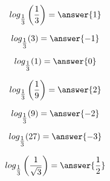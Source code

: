\documentclass{ximera}
\author{Lee Wayand}
\begin{document}
\begin{example}













\[
log_{ \tfrac{1}{3} }\left( \frac{1}{3} \right) = \answer{1}
\]





\[
log_{ \tfrac{1}{3} }(3) = \answer{-1}
\]







\[
log_{ \tfrac{1}{3} }(1) = \answer{0}
\]





\[
log_{ \tfrac{1}{3} }\left( \frac{1}{9} \right) = \answer{2}
\]





\[
log_{ \tfrac{1}{3} }(9) = \answer{-2}
\]







\[
log_{ \tfrac{1}{3} }(27) = \answer{-3}
\]





\[
log_{ \tfrac{1}{3} }\left( \frac{1}{\sqrt{3}} \right) = \answer{\frac{1}{2}}
\]





\end{example}
\end{document}
